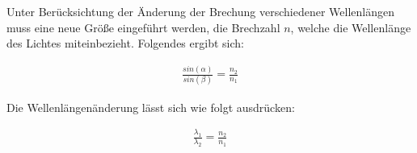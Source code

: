 \noindent Unter Berücksichtung der Änderung der Brechung verschiedener Wellenlängen muss eine neue Größe eingeführt werden, die Brechzahl $n$, welche die Wellenlänge des Lichtes miteinbezieht. Folgendes ergibt sich:
	
	\begin{align} \label{eq:brechungsgesetz}
		\frac{sin{(\alpha)}}{sin{(\beta)}} = \frac{n_2}{n_1}
	\end{align}
	
\noindent Die Wellenlängenänderung lässt sich wie folgt ausdrücken:

	\begin{align} \label{eq:wellenlaengenaenderung}
		\frac{\lambda_1}{\lambda_2} = \frac{n_2}{n_1}
	\end{align}


